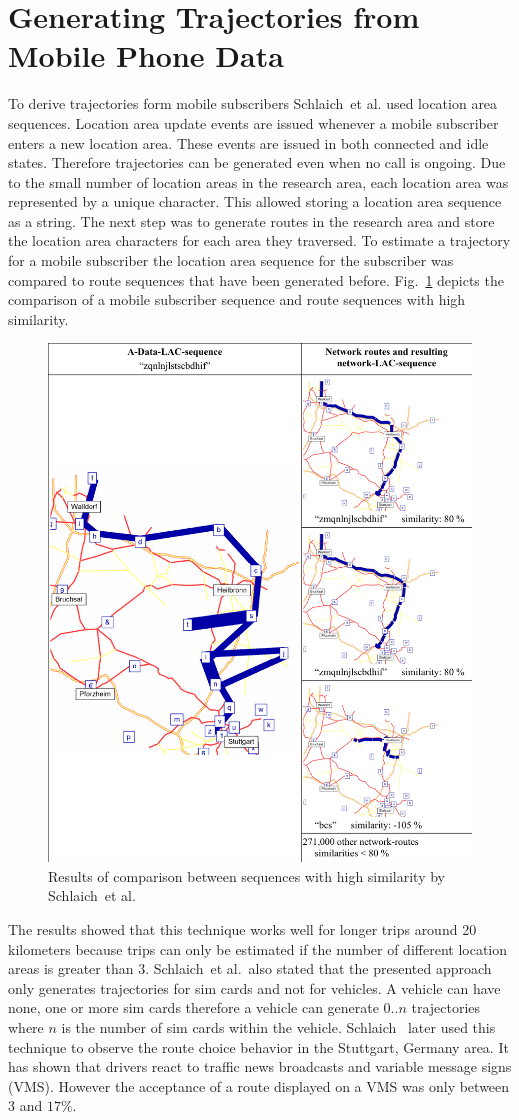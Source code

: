 \documentclass[master,english]{hgbthesis}
\begin{document}
\section{Generating Trajectories from Mobile Phone Data}
To derive trajectories form mobile subscribers Schlaich~et al. \cite{Schlaich2010a} used location area sequences. Location area update events are issued whenever a mobile subscriber enters a new location area. These events are issued in both connected and idle states. Therefore trajectories can be generated even when no call is ongoing. Due to the small number of location areas in the research area, each location area was represented by a unique character. This allowed storing a location area sequence as a string. The next step was to generate routes in the research area and store the location area characters for each area they traversed. To estimate a trajectory for a mobile subscriber the location area sequence for the subscriber was compared to route sequences that have been generated before. Fig.\ \ref{fig:schlaichcomp} depicts the comparison of a mobile subscriber sequence and route sequences with high similarity.
\begin{figure}
\centering
\includegraphics[width=0.7\linewidth]{./images/schlaichcomp.pdf}
\caption{Results of comparison between sequences with high similarity by Schlaich~et al.\ \cite{Schlaich2010a}}
\label{fig:schlaichcomp}
\end{figure}
The results showed that this technique works well for longer trips around 20 kilometers because trips can only be estimated if the number of different location areas is greater than 3. Schlaich~et al.\ also stated that the presented approach only generates trajectories for sim cards and not for vehicles. A vehicle can have none, one or more sim cards therefore a vehicle can generate $0..n$ trajectories where $n$ is the number of sim cards within the vehicle.
Schlaich~\cite{Schlaich2010} later used this technique to observe the route choice behavior in the Stuttgart, Germany area. It has shown that drivers react to traffic news broadcasts and variable message signs (VMS). However the acceptance of a route displayed on a VMS was only between $3$ and $17\%$.
\end{document}
